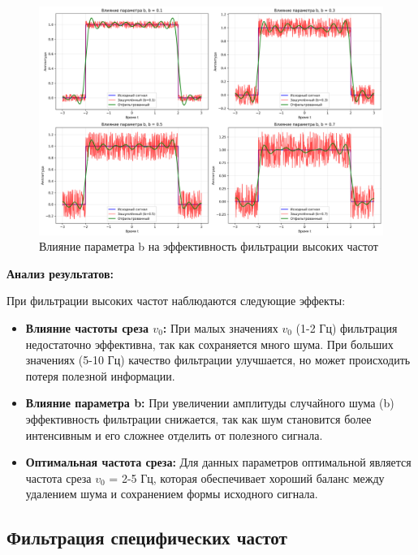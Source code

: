 \begin{figure}[H]
\centering
\includegraphics[width=\textwidth]{images/task1/high_freq_filter_b_influence.png}
\caption{Влияние параметра b на эффективность фильтрации высоких частот}
\end{figure}

\textbf{Анализ результатов:}

При фильтрации высоких частот наблюдаются следующие эффекты:

\begin{itemize}
    \item \textbf{Влияние частоты среза $v_0$:} При малых значениях $v_0$ (1-2 Гц) фильтрация недостаточно эффективна, так как сохраняется много шума. При больших значениях (5-10 Гц) качество фильтрации улучшается, но может происходить потеря полезной информации.
    
    \item \textbf{Влияние параметра b:} При увеличении амплитуды случайного шума (b) эффективность фильтрации снижается, так как шум становится более интенсивным и его сложнее отделить от полезного сигнала.
    
    \item \textbf{Оптимальная частота среза:} Для данных параметров оптимальной является частота среза $v_0$ = 2-5 Гц, которая обеспечивает хороший баланс между удалением шума и сохранением формы исходного сигнала.
\end{itemize}

\subsection*{Фильтрация специфических частот}

